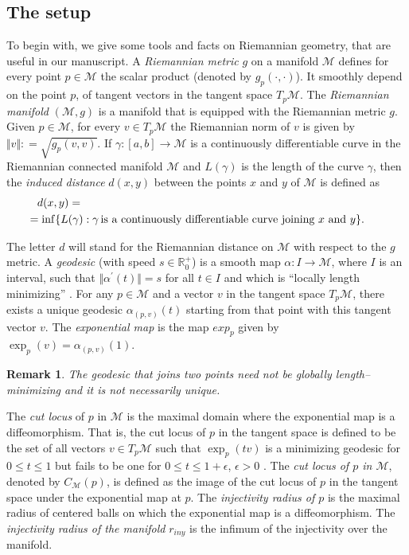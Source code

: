\documentclass[a4paper]{article}
\def\defeq{\mathrel{\mathop:}=}
\numberwithin{equation}{section}
\newtheorem{remark}{Remark}
\def\defeq{\mathrel{\mathop:}=}
\newcommand{\M}{\mbox{$\mathcal{M}$}}
\begin{document}
\subsection{The setup}
To begin with, we give some tools and facts on Riemannian geometry, that are useful in our manuscript. A \textit{Riemannian metric} $g$ on a manifold $\M$ defines for every point $p \in \M$  the scalar product (denoted by $g_p(\cdot,\cdot)$). It smoothly depend on the point $p$,  of tangent vectors in the tangent space $T_p \M$. The \textit{Riemannian manifold} $(\M,g)$ is a manifold that is equipped with the Riemannian metric  $g$. 
Given $p \in \M$, for every $v \in T_p \M$ the Riemannian norm of $v$ is given by $\Vert v \Vert \defeq \sqrt{g_p(v,v)}$.
 If  $\gamma: [a, b] \rightarrow \M$ is a continuously differentiable curve in the Riemannian connected manifold $\M$ and  $L(\gamma)$ is the length of the curve $\gamma$,  then the \textit{induced distance}  $d(x, y)$ between the points $x$ and $y$ of $\M$ is defined as
  \begin{align*}
 d(x,y)= \\
 &\hspace{-1.7 cm}= \inf \{ L(\gamma) : \gamma \, \textrm{is a continuously differentiable curve joining $x$ and $y$}\}.
  \end{align*}

 
 
The letter $d$ will stand for the Riemannian distance on $\M$  with respect to the $g$ metric. A \textit{geodesic} (with speed $s \in \mathbb{R}^{+}_0$) is a smooth map $\alpha:I \rightarrow \M$, where $I$ is an interval, such that $\Vert \alpha^{'}(t) \Vert= s$  for all $t \in I$ and which is ``locally length minimizing'' . For any $p \in \M$ and a vector $v$ in the tangent space $T_p \M$, there exists a unique geodesic  $\alpha_{(p,v)}(t)$ starting from that point with this tangent vector $v$. The \textit{exponential map} is the map $exp_p$ given by $\exp_p (v) = \alpha_{(p,v)}(1)$. 
\begin{remark}
The geodesic that joins two points need not be globally length--minimizing and it is not necessarily unique.
\end{remark}
 The \textit{cut locus} of $p$  in $\M$  is the maximal domain where the exponential map is a diffeomorphism. That is, the cut locus of $p$ in the tangent space is defined to be the set of all vectors $v \in T_{p} \M$ such that  $\exp _{p}(tv)$ is a minimizing geodesic for  $0 \leq t \leq 1$  but fails to be one for $0 \leq t \leq 1+ \epsilon$, $\epsilon >0$ . The \textit{cut locus of $p$ in $\M$}, denoted  by $C_{\M}(p)$, is defined as the image of the cut locus of  $p$ in the tangent space under the exponential map at $p$. The \textit{injectivity radius of $p$} is the maximal radius of centered balls on which the exponential map is a diffeomorphism. The \textit{injectivity radius of the manifold}  $r_{iny}$ is the infimum of the injectivity over the manifold.
\end{document}
